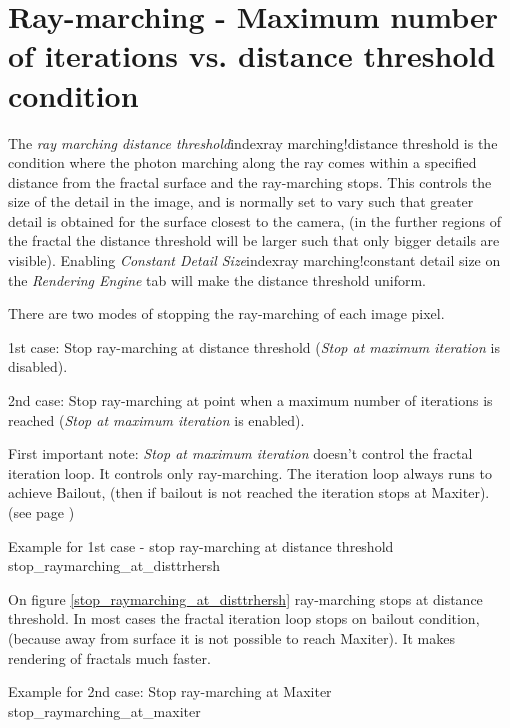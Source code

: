 \section{Ray-marching - Maximum number of iterations vs. distance threshold
	condition}\label{ray-marching---maximum-number-of-iterations-vs.-distance-threshold-condition}

The \emph{ray marching distance threshold}index{ray marching!distance threshold} is the condition where the photon
marching along the ray comes within a specified distance from the fractal
surface and the ray-marching stops. This controls the size of the detail in the
image, and is normally set to vary such that greater detail is obtained for the
surface closest to the camera, (in the further regions of the fractal the
distance threshold will be larger such that only bigger details are visible).
Enabling \emph{Constant Detail Size}index{ray marching!constant detail size} on the \emph{Rendering Engine} tab will
make the distance threshold uniform.

There are two modes of stopping the ray-marching of each image pixel.

1st case: Stop ray-marching at distance threshold (\emph{Stop at maximum
	iteration} is disabled).

2nd case: Stop ray-marching at point when a maximum number of iterations is
reached (\emph{Stop at maximum iteration} is enabled).

First important note: \emph{Stop at maximum iteration} doesn't control the
fractal iteration loop. It controls only ray-marching. The iteration loop always
runs to achieve Bailout, (then if bailout is not reached the iteration stops at
Maxiter). (see page \pageref{bailout-maxiter})

{Example for 1st case - stop ray-marching at distance threshold}
{stop_raymarching_at_disttrhersh}

On figure \ref{stop_raymarching_at_disttrhersh} ray-marching stops at distance threshold. In most cases the fractal iteration
loop stops on bailout condition, (because away from surface it is not possible
to reach Maxiter). It makes rendering of fractals much faster.

{Example for 2nd case: Stop ray-marching at Maxiter}
{stop_raymarching_at_maxiter}

